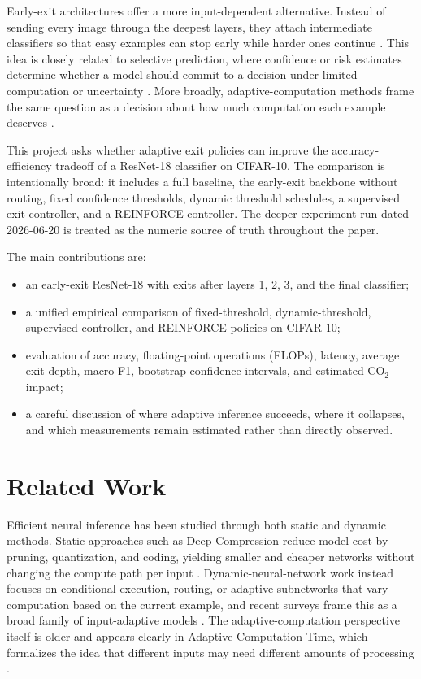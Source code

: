 \documentclass[10pt,twocolumn]{article}
\newcommand{\dataset}{CIFAR-10}
\newcommand{\backbone}{ResNet-18}
\begin{document}
Early-exit architectures offer a more input-dependent alternative. Instead of sending every image through the deepest layers, they attach intermediate classifiers so that easy examples can stop early while harder ones continue \cite{teerapittayanon2017branchynet,huang2017multiscale}. This idea is closely related to selective prediction, where confidence or risk estimates determine whether a model should commit to a decision under limited computation or uncertainty \cite{geifman2017selective}. More broadly, adaptive-computation methods frame the same question as a decision about how much computation each example deserves \cite{graves2016adaptive}.

This project asks whether adaptive exit policies can improve the accuracy-efficiency tradeoff of a \backbone{} classifier on \dataset{}. The comparison is intentionally broad: it includes a full baseline, the early-exit backbone without routing, fixed confidence thresholds, dynamic threshold schedules, a supervised exit controller, and a REINFORCE controller. The deeper experiment run dated 2026-06-20 is treated as the numeric source of truth throughout the paper.

The main contributions are:
\begin{itemize}
    \item an early-exit \backbone{} with exits after layers 1, 2, 3, and the final classifier;
    \item a unified empirical comparison of fixed-threshold, dynamic-threshold, supervised-controller, and REINFORCE policies on \dataset{};
    \item evaluation of accuracy, floating-point operations (FLOPs), latency, average exit depth, macro-F1, bootstrap confidence intervals, and estimated CO$_2$ impact;
    \item a careful discussion of where adaptive inference succeeds, where it collapses, and which measurements remain estimated rather than directly observed.
\end{itemize}

\section{Related Work}

Efficient neural inference has been studied through both static and dynamic methods. Static approaches such as Deep Compression reduce model cost by pruning, quantization, and coding, yielding smaller and cheaper networks without changing the compute path per input \cite{han2015deep}. Dynamic-neural-network work instead focuses on conditional execution, routing, or adaptive subnetworks that vary computation based on the current example, and recent surveys frame this as a broad family of input-adaptive models \cite{han2021dynamic}. The adaptive-computation perspective itself is older and appears clearly in Adaptive Computation Time, which formalizes the idea that different inputs may need different amounts of processing \cite{graves2016adaptive}.
\end{document}
